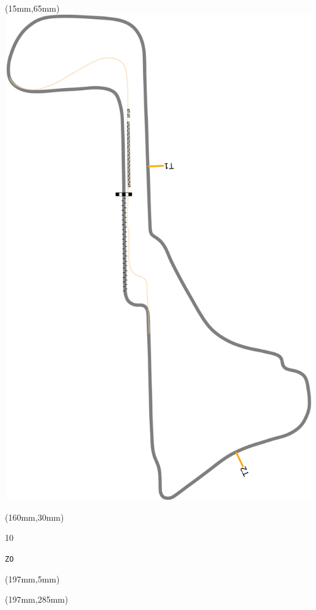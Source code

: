 \begin{textblock*}{185mm}(15mm,65mm)%
\centering
\mbox{\includegraphics[width=185mm,height=210mm,keepaspectratio]{PT/ZO.pdf}}
\end{textblock*}
\begin{textblock*}{40mm}(160mm,30mm)%
\Large
\par{} 
\par10 
\par\hfill\tiny\tt ZO\\
\end{textblock*}
\begin{textblock*}{20mm}(197mm,5mm)%
\fbox{\thepage}
\label{ZO}
\end{textblock*}
\begin{textblock*}{20mm}(197mm,285mm)%
\fbox{\thepage}
\end{textblock*}

